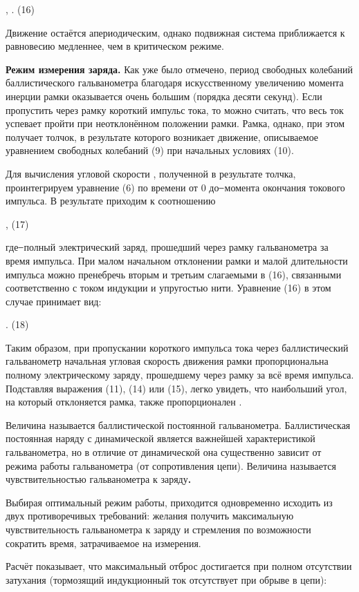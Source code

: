 \documentclass[]{article}
\begin{document}
, . (16)

Движение остаётся апериодическим, однако подвижная система приближается
к равновесию медленнее, чем в критическом режиме.

\textbf{Режим измерения заряда.} Как уже было отмечено, период свободных
колебаний баллистического гальванометра благодаря искусственному
увеличению момента инерции рамки оказывается очень большим (порядка
десяти секунд). Если пропустить через рамку короткий импульс тока, то
можно считать, что весь ток успевает пройти при неотклонённом положении
рамки. Рамка, однако, при этом получает толчок, в результате которого
возникает движение, описываемое уравнением свободных колебаний (9) при
начальных условиях (10).

Для вычисления угловой скорости , полученной в результате толчка,
проинтегрируем уравнение (6) по времени от 0 до ̶ момента окончания
токового импульса. В результате приходим к соотношению

, (17)

где ̶ полный электрический заряд, прошедший через рамку гальванометра за
время импульса. При малом начальном отклонении рамки и малой
длительности импульса можно пренебречь вторым и третьим слагаемыми в
(16), связанными соответственно с током индукции и упругостью нити.
Уравнение (16) в этом случае принимает вид:

. (18)

Таким образом, при пропускании короткого импульса тока через
баллистический гальванометр начальная угловая скорость движения рамки
пропорциональна полному электрическому заряду, прошедшему через рамку за
всё время импульса. Подставляя выражения (11), (14) или (15), легко
увидеть, что наибольший угол, на который отклоняется рамка, также
пропорционален .

Величина называется баллистической постоянной гальванометра.
Баллистическая постоянная наряду с динамической является важнейшей
характеристикой гальванометра, но в отличие от динамической она
существенно зависит от режима работы гальванометра (от сопротивления
цепи). Величина называется чувствительностью гальванометра к
заряду\textbf{.}

Выбирая оптимальный режим работы, приходится одновременно исходить из
двух противоречивых требований: желания получить максимальную
чувствительность гальванометра к заряду и стремления по возможности
сократить время, затрачиваемое на измерения.

Расчёт показывает, что максимальный отброс достигается при полном
отсутствии затухания (тормозящий индукционный ток отсутствует при обрыве
в цепи):
\end{document}
